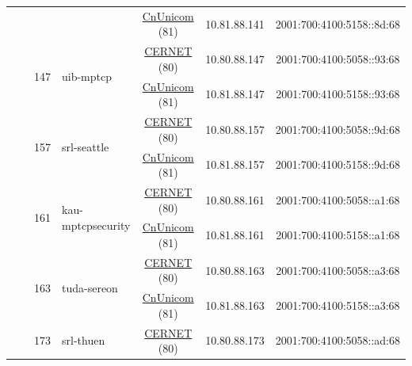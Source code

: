 \begin{small}
\begin{center}
\begin{longtable}{|c|c|c|c|c|c|c|c|}
  &  &  &  & \multicolumn{2}{|c|}{\tiny{\href{http://www.chinaunicom.com}{CnUnicom} (81)}} & \tiny{10.81.88.141} & \tiny{2001:700:4100:5158::8d:68} \\* \cline{3-3}\cline{4-4}\cline{5-5}\cline{6-6}\cline{7-7}\cline{8-8}
  &  & \multirow{2}{*}{\tiny{147}} & \multicolumn{1}{|l|}{\multirow{2}{*}{\tiny{uib-mptcp}}} & \multicolumn{2}{|c|}{\tiny{\href{http://www.cernet.edu.cn}{CERNET} (80)}} & \tiny{10.80.88.147} & \tiny{2001:700:4100:5058::93:68} \\* \cline{5-5}\cline{6-6}\cline{7-7}\cline{8-8}
  &  &  &  & \multicolumn{2}{|c|}{\tiny{\href{http://www.chinaunicom.com}{CnUnicom} (81)}} & \tiny{10.81.88.147} & \tiny{2001:700:4100:5158::93:68} \\* \cline{3-3}\cline{4-4}\cline{5-5}\cline{6-6}\cline{7-7}\cline{8-8}
  &  & \multirow{2}{*}{\tiny{157}} & \multicolumn{1}{|l|}{\multirow{2}{*}{\tiny{srl-seattle}}} & \multicolumn{2}{|c|}{\tiny{\href{http://www.cernet.edu.cn}{CERNET} (80)}} & \tiny{10.80.88.157} & \tiny{2001:700:4100:5058::9d:68} \\* \cline{5-5}\cline{6-6}\cline{7-7}\cline{8-8}
  &  &  &  & \multicolumn{2}{|c|}{\tiny{\href{http://www.chinaunicom.com}{CnUnicom} (81)}} & \tiny{10.81.88.157} & \tiny{2001:700:4100:5158::9d:68} \\* \cline{3-3}\cline{4-4}\cline{5-5}\cline{6-6}\cline{7-7}\cline{8-8}
  &  & \multirow{2}{*}{\tiny{161}} & \multicolumn{1}{|l|}{\multirow{2}{*}{\tiny{kau-mptcpsecurity}}} & \multicolumn{2}{|c|}{\tiny{\href{http://www.cernet.edu.cn}{CERNET} (80)}} & \tiny{10.80.88.161} & \tiny{2001:700:4100:5058::a1:68} \\* \cline{5-5}\cline{6-6}\cline{7-7}\cline{8-8}
  &  &  &  & \multicolumn{2}{|c|}{\tiny{\href{http://www.chinaunicom.com}{CnUnicom} (81)}} & \tiny{10.81.88.161} & \tiny{2001:700:4100:5158::a1:68} \\* \cline{3-3}\cline{4-4}\cline{5-5}\cline{6-6}\cline{7-7}\cline{8-8}
  &  & \multirow{2}{*}{\tiny{163}} & \multicolumn{1}{|l|}{\multirow{2}{*}{\tiny{tuda-sereon}}} & \multicolumn{2}{|c|}{\tiny{\href{http://www.cernet.edu.cn}{CERNET} (80)}} & \tiny{10.80.88.163} & \tiny{2001:700:4100:5058::a3:68} \\* \cline{5-5}\cline{6-6}\cline{7-7}\cline{8-8}
  &  &  &  & \multicolumn{2}{|c|}{\tiny{\href{http://www.chinaunicom.com}{CnUnicom} (81)}} & \tiny{10.81.88.163} & \tiny{2001:700:4100:5158::a3:68} \\* \cline{3-3}\cline{4-4}\cline{5-5}\cline{6-6}\cline{7-7}\cline{8-8}
  &  & \multirow{2}{*}{\tiny{173}} & \multicolumn{1}{|l|}{\multirow{2}{*}{\tiny{srl-thuen}}} & \multicolumn{2}{|c|}{\tiny{\href{http://www.cernet.edu.cn}{CERNET} (80)}} & \tiny{10.80.88.173} & \tiny{2001:700:4100:5058::ad:68} \\* \cline{5-5}\cline{6-6}\cline{7-7}\cline{8-8}

\end{longtable}
\end{center}
\end{small}
